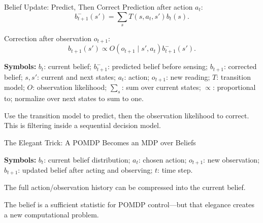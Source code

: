 \documentclass[aspectratio=169,10pt]{beamer}
\newcommand{\equationlegend}[1]{%
  \par\smallskip
  \begingroup
    \setlength{\fboxsep}{4pt}%
    \noindent\colorbox{DeckSoft}{%
      \parbox{\dimexpr\linewidth-2\fboxsep\relax}{%
        \footnotesize\textbf{Symbols:} #1%
      }%
    }\par
  \endgroup
  \smallskip
}
\begin{document}
\begin{frame}[shrink=10]{Belief Update: Predict, Then Correct}
  Prediction after action $a_t$:
  \[
    b^-_{t+1}(s')=\sum_s T(s,a_t,s')b_t(s).
  \]

  Correction after observation $o_{t+1}$:
  \[
    b_{t+1}(s')\propto O(o_{t+1}\mid s',a_t)b^-_{t+1}(s').
  \]
  \equationlegend{$b_t$: current belief; $b^-_{t+1}$: predicted belief before sensing; $b_{t+1}$: corrected belief; $s,s'$: current and next states; $a_t$: action; $o_{t+1}$: new reading; $T$: transition model; $O$: observation likelihood; $\sum_s$: sum over current states; $\propto$: proportional to; normalize over next states to sum to one.}

  \begin{keyidea}
    Use the transition model to predict, then the observation likelihood to correct. This is filtering inside a sequential decision model.
  \end{keyidea}
\end{frame}

\begin{frame}[shrink=10]{The Elegant Trick: A POMDP Becomes an MDP over Beliefs}
  \begin{center}
  \end{center}
  \equationlegend{$b_t$: current belief distribution; $a_t$: chosen action; $o_{t+1}$: new observation; $b_{t+1}$: updated belief after acting and observing; $t$: time step.}

  The full action/observation history can be compressed into the current belief.

  \begin{keyidea}
    The belief is a sufficient statistic for POMDP control---but that elegance creates a new computational problem.
  \end{keyidea}
\end{frame}
\end{document}
